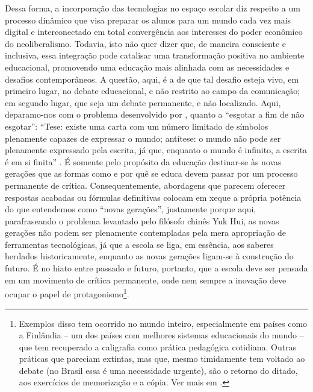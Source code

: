 \documentclass[portuguese]{textolivre}
\begin{document}
Dessa forma, a incorporação das tecnologias no espaço escolar diz respeito a um processo dinâmico que visa preparar os alunos para um mundo cada vez mais digital e interconectado em total convergência aos interesses do poder econômico do neoliberalismo. Todavia, isto não quer dizer que, de maneira consciente e inclusiva, essa integração pode catalisar uma transformação positiva no ambiente educacional, promovendo uma educação mais alinhada com as necessidades e desafios contemporâneos. A questão, aqui, é a de que tal desafio esteja vivo, em primeiro lugar, no debate educacional, e não restrito ao campo da comunicação; em segundo lugar, que seja um debate permanente, e não localizado. Aqui, deparamo-nos com o problema desenvolvido por \textcite{hui_tecnodiversidade_2020}, quanto a “esgotar a fim de não esgotar”: “Tese: existe uma carta com um número limitado de símbolos plenamente capazes de expressar o mundo; antítese: o mundo não pode ser plenamente expressado pela escrita, já que, enquanto o mundo é infinito, a escrita é em si finita” \cite[p. 153]{hui_tecnodiversidade_2020}. É somente pelo propósito da educação destinar-se às novas gerações que as formas como e por quê se educa devem passar por um processo permanente de crítica. Consequentemente, abordagens que parecem oferecer respostas acabadas ou fórmulas definitivas colocam em xeque a própria potência do que entendemos como “novas gerações”, justamente porque aqui, parafraseando o problema levantado pelo filósofo chinês Yuk Hui, as novas gerações não podem ser plenamente contempladas pela mera apropriação de ferramentas tecnológicas, já que a escola se liga, em essência, aos saberes herdados historicamente, enquanto as novas gerações ligam-se à construção do futuro. É no hiato entre passado e futuro, portanto, que a escola deve ser pensada em um movimento de crítica permanente, onde nem sempre a inovação deve ocupar o papel de protagonismo\footnote{Exemplos disso tem ocorrido no mundo inteiro, especialmente em países como a Finlândia – um dos países com melhores sistemas educacionais do mundo – que tem recuperado a caligrafia como prática pedagógica cotidiana. Outras práticas que pareciam extintas, mas que, mesmo timidamente tem voltado ao debate (no Brasil essa é uma necessidade urgente), são o retorno do ditado, aos exercícios de memorização e a cópia. Ver mais em \textcite{desmurget_fabrica_2021,turcke_hiperativos!_2016}.}.
\end{document}

